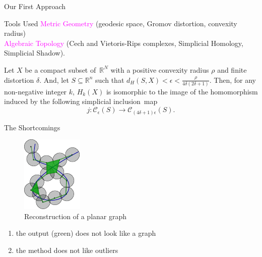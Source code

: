 \documentclass[10pt,sans-serif]{beamer}
\begin{document}
\begin{frame}{Our First Approach}
  \begin{block}{Tools Used}
    \textcolor{magenta}{Metric Geometry} (geodesic space, Gromov distortion,
    convexity radius) \\
    \vspace{20pt} \textcolor{magenta}{Algebraic Topology} (Cech and Vietoris-Rips
    complexes, Simplicial Homology, Simplicial Shadow).
  \end{block}

  \pause
  
  \begin{theorem}[\textcolor{gray}{submitted to SOCG'19}]
    Let $X$ be a compact subset of~$\mathbb{R}^N$ with a positive convexity
    radius $\rho$ and finite distortion $\delta$. And, let $S \subseteq
    \mathbb{R}^n$ such that
    $d_H(S,X)<\epsilon<\frac{\rho}{4\delta(2\delta+1)}$. Then, for any
    non-negative integer $k$, $H_k(X)$ is isomorphic to the image of the
    homomorphism induced by the following simplicial inclusion~map
    $$j:\mathcal{C}_\epsilon(S)\to\mathcal{C}_{(4\delta+1)\epsilon}(S).$$
  \end{theorem}
\end{frame}


\begin{frame}{The Shortcomings}  
  \begin{figure}
    \centering
    \includegraphics[scale=1.8]{graph-recon}
    \caption{Reconstruction of a planar graph}
  \end{figure}

  \pause

  \begin{block}{}
    \begin{enumerate}
    \item the output (green) does not look like a graph
    \item the method does not like outliers
    \end{enumerate}
  \end{block}
\end{frame}
\end{document}
